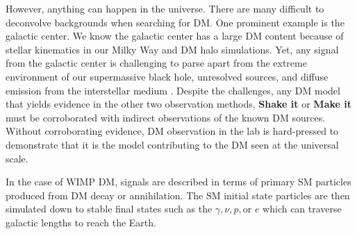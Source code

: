 \begin{figure}[ht]
\end{figure}

However, anything can happen in the universe.
There are many difficult to deconvolve backgrounds when searching for DM.
One prominent example is the galactic center.
We know the galactic center has a large DM content because of stellar kinematics in our Milky Way and DM halo simulations.
Yet, any signal from the galactic center is challenging to parse apart from the extreme environment of our supermassive black hole, unresolved sources, and diffuse emission from the interstellar medium \cite{Tracy:les_houches}.
Despite the challenges, any DM model that yields evidence in the other two observation methods, \textbf{Shake it} or \textbf{Make it} must be corroborated with indirect observations of the known DM sources.
Without corroborating evidence, DM observation in the lab is hard-pressed to demonstrate that it is the model contributing to the DM seen at the universal scale.

In the case of WIMP DM, signals are described in terms of primary SM particles produced from DM decay or annihilation.
The SM initial state particles are then simulated down to stable final states such as the $\gamma, \nu, p, \text{or } e$ which can traverse galactic lengths to reach the Earth.

